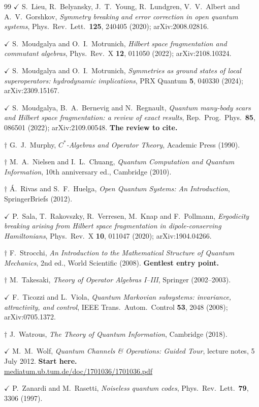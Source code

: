 \documentclass[11pt]{article}
\theoremstyle{plain}
\theoremstyle{remark}
\begin{document}
\begin{thebibliography}{99}
 $\checkmark$ S.~Lieu, R.~Belyansky, J.~T.~Young,
  R.~Lundgren, V.~V.~Albert and A.~V.~Gorshkov,
  \emph{Symmetry breaking and error correction in open quantum systems},
  Phys.\ Rev.\ Lett.\ \textbf{125}, 240405 (2020); arXiv:2008.02816.

 $\checkmark$ S.~Moudgalya and O.~I.~Motrunich,
  \emph{Hilbert space fragmentation and commutant algebras},
  Phys.\ Rev.\ X \textbf{12}, 011050 (2022); arXiv:2108.10324.

 $\checkmark$ S.~Moudgalya and O.~I.~Motrunich,
  \emph{Symmetries as ground states of local superoperators: hydrodynamic
  implications},
  PRX Quantum \textbf{5}, 040330 (2024); arXiv:2309.15167.

 $\checkmark$ S.~Moudgalya, B.~A.~Bernevig and N.~Regnault,
  \emph{Quantum many-body scars and Hilbert space fragmentation: a review of
  exact results},
  Rep.\ Prog.\ Phys.\ \textbf{85}, 086501 (2022); arXiv:2109.00548.
  \textbf{The review to cite.}

 $\dagger$ G.~J.~Murphy,
  \emph{$C^*$-Algebras and Operator Theory}, Academic Press (1990).

 $\dagger$ M.~A.~Nielsen and I.~L.~Chuang,
  \emph{Quantum Computation and Quantum Information},
  10th anniversary ed., Cambridge (2010).

 $\dagger$ \'A.~Rivas and S.~F.~Huelga,
  \emph{Open Quantum Systems: An Introduction}, SpringerBriefs (2012).

 $\checkmark$ P.~Sala, T.~Rakovszky, R.~Verresen, M.~Knap and
  F.~Pollmann,
  \emph{Ergodicity breaking arising from Hilbert space fragmentation in
  dipole-conserving Hamiltonians},
  Phys.\ Rev.\ X \textbf{10}, 011047 (2020); arXiv:1904.04266.

 $\dagger$ F.~Strocchi,
  \emph{An Introduction to the Mathematical Structure of Quantum Mechanics},
  2nd ed., World Scientific (2008). \textbf{Gentlest entry point.}

 $\dagger$ M.~Takesaki,
  \emph{Theory of Operator Algebras I--III}, Springer (2002--2003).

 $\checkmark$ F.~Ticozzi and L.~Viola,
  \emph{Quantum Markovian subsystems: invariance, attractivity, and control},
  IEEE Trans.\ Autom.\ Control \textbf{53}, 2048 (2008); arXiv:0705.1372.

 $\dagger$ J.~Watrous,
  \emph{The Theory of Quantum Information}, Cambridge (2018).

 $\checkmark$ M.~M.~Wolf,
  \emph{Quantum Channels \& Operations: Guided Tour},
  lecture notes, 5 July 2012. \textbf{Start here.}\\
  \href{https://mediatum.ub.tum.de/doc/1701036/1701036.pdf}%
  {mediatum.ub.tum.de/doc/1701036/1701036.pdf}

 $\checkmark$ P.~Zanardi and M.~Rasetti,
  \emph{Noiseless quantum codes},
  Phys.\ Rev.\ Lett.\ \textbf{79}, 3306 (1997).

\end{thebibliography}
\end{document}
